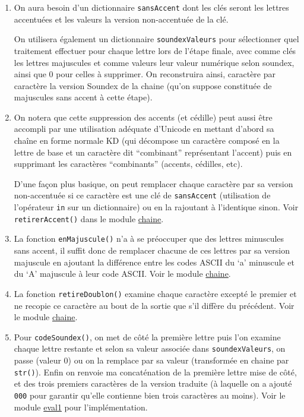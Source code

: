 \documentclass[french]{scrartcl}
\begin{document}
\begin{enumerate}
\def\labelenumi{\arabic{enumi}.}
\setcounter{enumi}{4}
\item
  On aura besoin d'un dictionnaire \texttt{sansAccent} dont les clés
  seront les lettres accentuées et les valeurs la version non-accentuée
  de la clé.

  On utilisera également un dictionnaire \texttt{soundexValeurs} pour
  sélectionner quel traitement effectuer pour chaque lettre lors de
  l'étape finale, avec comme clés les lettres majuscules et comme
  valeurs leur valeur numérique selon soundex, ainsi que 0 pour celles à
  supprimer. On reconstruira ainsi, caractère par caractère la version
  Soundex de la chaine (qu'on suppose constituée de majuscules sans
  accent à cette étape).
\item
  On notera que cette suppression des accents (et cédille) peut aussi
  être accompli par une utilisation adéquate d'Unicode en mettant
  d'abord sa chaîne en forme normale KD (qui décompose un caractère
  composé en la lettre de base et un caractère dit ``combinant''
  représentant l'accent) puis en supprimant les caractères
  ``combinants'' (accents, cédilles, etc).

  D'une façon plus basique, on peut remplacer chaque caractère par sa
  version non-accentuée si ce caractère est une clé de
  \texttt{sansAccent} (utilisation de l'opérateur \texttt{in} sur un
  dictionnaire) ou en la rajoutant à l'identique sinon. Voir
  \texttt{retirerAccent()} dans le module \href{chaine.py}{chaine}.
\item
  La fonction \texttt{enMajuscule()} n'a à se préoccuper que des lettres
  minuscules sans accent, il suffit donc de remplacer chacune de ces
  lettres par sa version majuscule en ajoutant la différence entre les
  codes ASCII du `a' minuscule et du `A' majuscule à leur code ASCII.
  Voir le module \href{chaine.py}{chaine}.
\item
  La fonction \texttt{retireDoublon()} examine chaque caractère excepté
  le premier et ne recopie ce caractère au bout de la sortie que s'il
  diffère du précédent. Voir le module \href{chaine.py}{chaine}.
\item
  Pour \texttt{codeSoundex()}, on met de côté la première lettre puis
  l'on examine chaque lettre restante et selon sa valeur associée dans
  \texttt{soundexValeurs}, on passe (valeur 0) ou on la remplace par sa
  valeur (transformée en chaine par \texttt{str()}). Enfin on renvoie ma
  concaténation de la première lettre mise de côté, et des trois
  premiers caractères de la version traduite (à laquelle on a ajouté
  \texttt{\textquotesingle{}000\textquotesingle{}} pour garantir qu'elle
  contienne bien trois caractères au moins). Voir le module
  \href{eval1.py}{eval1} pour l'implémentation.
\end{enumerate}
\end{document}
